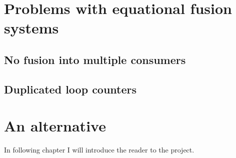 \documentclass[preamble.tex]{subfiles}
\begin{document}
\clearpage
\section{Problems with equational fusion systems}

\subsection{No fusion into multiple consumers}

\subsection{Duplicated loop counters}

\clearpage
\section{An alternative}

In following chapter I will introduce the reader to the \DPH project.
\IfNotCompilingAll{}
\end{document}
